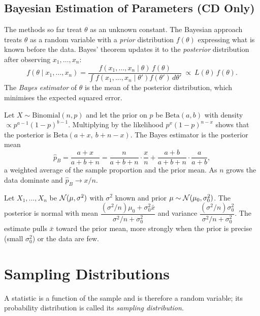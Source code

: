 \subsection{Bayesian Estimation of Parameters (CD Only)}

The methods so far treat $\theta$ as an unknown constant. The Bayesian approach treats $\theta$ as a random variable with a \emph{prior} distribution $f(\theta)$ expressing what is known before the data. Bayes' theorem updates it to the \emph{posterior} distribution after observing $x_1,\dots,x_n$:
\[ f(\theta\mid x_1,\dots,x_n)=\frac{f(x_1,\dots,x_n\mid\theta)\,f(\theta)}{\int f(x_1,\dots,x_n\mid\theta')f(\theta')\,d\theta'}\ \propto\ L(\theta)\,f(\theta). \]
The \emph{Bayes estimator} of $\theta$ is the mean of the posterior distribution, which minimises the expected squared error.

\begin{example}\label{ex:betabin}
Let $X\sim\mathrm{Binomial}(n,p)$ and let the prior on $p$ be $\mathrm{Beta}(a,b)$ with density $\propto p^{a-1}(1-p)^{b-1}$. Multiplying by the likelihood $p^x(1-p)^{n-x}$ shows that the posterior is $\mathrm{Beta}(a+x,\ b+n-x)$. The Bayes estimator is the posterior mean
\[ \hat{p}_B=\frac{a+x}{a+b+n}=\frac{n}{a+b+n}\cdot\frac xn+\frac{a+b}{a+b+n}\cdot\frac a{a+b}, \]
a weighted average of the sample proportion and the prior mean. As $n$ grows the data dominate and $\hat{p}_B\to x/n$.
\end{example}

\begin{example}
Let $X_1,\dots,X_n$ be $\mathcal{N}(\mu,\sigma^2)$ with $\sigma^2$ known and prior $\mu\sim\mathcal{N}(\mu_0,\sigma_0^2)$. The posterior is normal with mean $\dfrac{(\sigma^2/n)\mu_0+\sigma_0^2\bar{x}}{\sigma^2/n+\sigma_0^2}$ and variance $\dfrac{(\sigma^2/n)\sigma_0^2}{\sigma^2/n+\sigma_0^2}$. The estimate pulls $\bar{x}$ toward the prior mean, more strongly when the prior is precise (small $\sigma_0^2$) or the data are few.
\end{example}

\section{Sampling Distributions}

\begin{definition}
A statistic is a function of the sample and is therefore a random variable; its probability distribution is called its \emph{sampling distribution}.
\end{definition}

